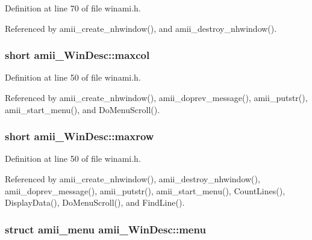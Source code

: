 Definition at line 70 of file winami.\+h.



Referenced by amii\+\_\+create\+\_\+nhwindow(), and amii\+\_\+destroy\+\_\+nhwindow().

\hypertarget{structamii__WinDesc_a7abaf7568c45c6f6efabdfdc13164a4c}{
\subsubsection[{maxcol}]{\setlength{\rightskip}{0pt plus 5cm}short amii\+\_\+\+Win\+Desc\+::maxcol}}\label{structamii__WinDesc_a7abaf7568c45c6f6efabdfdc13164a4c}


Definition at line 50 of file winami.\+h.



Referenced by amii\+\_\+create\+\_\+nhwindow(), amii\+\_\+doprev\+\_\+message(), amii\+\_\+putstr(), amii\+\_\+start\+\_\+menu(), and Do\+Menu\+Scroll().

\hypertarget{structamii__WinDesc_a1ca7af4b595bf7bb077ed78546548670}{
\subsubsection[{maxrow}]{\setlength{\rightskip}{0pt plus 5cm}short amii\+\_\+\+Win\+Desc\+::maxrow}}\label{structamii__WinDesc_a1ca7af4b595bf7bb077ed78546548670}


Definition at line 50 of file winami.\+h.



Referenced by amii\+\_\+create\+\_\+nhwindow(), amii\+\_\+destroy\+\_\+nhwindow(), amii\+\_\+doprev\+\_\+message(), amii\+\_\+putstr(), amii\+\_\+start\+\_\+menu(), Count\+Lines(), Display\+Data(), Do\+Menu\+Scroll(), and Find\+Line().

\hypertarget{structamii__WinDesc_aeffe06ac39ddf1ea949990646a1bbf0d}{
\subsubsection[{menu}]{\setlength{\rightskip}{0pt plus 5cm}struct {\bf amii\+\_\+menu} amii\+\_\+\+Win\+Desc\+::menu}}\label{structamii__WinDesc_aeffe06ac39ddf1ea949990646a1bbf0d}


